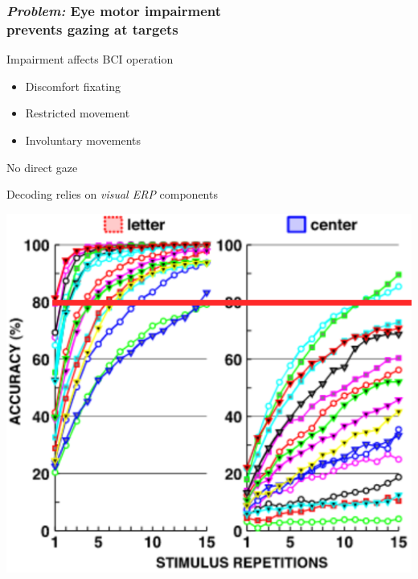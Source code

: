 \documentclass{kul-ulille-beamer}
\begin{document}
\begin{frame}
  \frametitle{\emph{Problem:} Eye motor impairment \\  prevents gazing at targets}

  \begin{minipage}[c]{.4\textwidth}
    \raggedright
    Impairment affects BCI operation
    {\tiny\cite{FriedOken2020}}
    {\small
    \begin{itemize}
      \footnotesize
      \item Discomfort fixating
      \item Restricted movement
      \item Involuntary movements
    \end{itemize}
    }
    No direct gaze
    \bigskip
    \bigskip

    Decoding relies on \emph{visual ERP} components \\ {\tiny\cite{Treder2010}}
  \end{minipage}\hfill%
  \begin{minipage}[c]{.4\textwidth}
		\centering
		\includegraphics[width=\textwidth]{figures/intro/covert_performance_drop/brunner_2010_line.png}

    {\tiny\cite{RonAngevin2019}}


	\end{minipage}
\end{frame}

\end{document}
